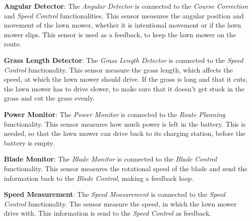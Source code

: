\textbf{Angular Detector}:
The \textit{Angular Detector} is connected to the \textit{Course Correction} and \textit{Speed Control} functionalities. This sensor measures the angular position and movement of the lawn mower, whether it is intentional movement or if the lawn mower slips. This sensor is used as a feedback, to keep the lawn mower on the route.

\textbf{Grass Length Detector}:
The \textit{Grass Length Detector} is connected to the \textit{Speed Control} functionality. This sensor measure the  grass length, which affects the speed, at which the lawn mower should drive. If the grass is long and that it cuts, the lawn mower has to drive slower, to make sure that it doesn't get stuck in the grass and cut the grass evenly. 

\textbf{Power Monitor}:
The \textit{Power Monitor} is connected to the \textit{Route Planning} functionality. This sensor measures how much power  is left in the battery. This is needed, so that the lawn mower can drive back to its charging station, before the battery is empty.

\textbf{Blade Monitor}:
The \textit{Blade Monitor} is connected to the \textit{Blade Control} functionality. This sensor measures the rotational speed of the blade and send the information back to the \textit{Blade Control}, making a feedback loop.

\textbf{Speed Measurement}:
The \textit{Speed Measurement} is connected to the \textit{Speed Control} functionality. The sensor measure the speed, in which the lawn mower drive with. This information is send to the \textit{Speed Control} as feedback.